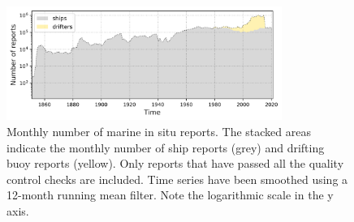 \begin{figure} [h]
    \centering
    \includegraphics[width=0.8\textwidth]{resources/nreports-ts.png}
    \caption{Monthly number of marine in situ reports. The stacked areas indicate the monthly number of ship reports (grey) and drifting buoy reports (yellow). Only reports that have passed all the quality control checks are included. Time series have been smoothed using a 12-month running mean filter. Note the logarithmic scale in the y axis.\\}
    \label{fig:nreports-ts}
\end{figure}

